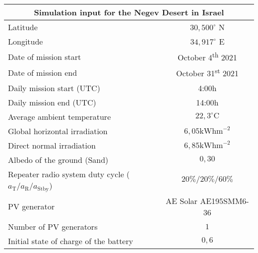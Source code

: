 \footnotesize
\begin{tabular}{|l|c|}
	\hline
	\multicolumn{2}{|c|}{\textbf{Simulation input for the Negev Desert in Israel}} \\
	\hline
	Latitude & $30,500^\circ$ N \\
	Longitude & $34,917^\circ$ E \\ 
	Date of mission start & October 4\textsuperscript{th} 2021 \\
	Date of mission end & October 31\textsuperscript{st} 2021 \\
	Daily mission start (UTC) & 4:00h \\
	Daily mission end (UTC) & 14:00h \\
	Average ambient temperature & $22,3^\circ \mathrm{C}$ \\
	Global horizontal irradiation & $6,05\mathrm{kWhm}^{-2}$ \\
	Direct normal irradiation & $6,85\mathrm{kWhm}^{-2}$ \\
	Albedo of the ground (Sand) & $0,30$ \\
	Repeater radio system duty cycle ($a_\mathrm{T}/a_\mathrm{R}/a_\mathrm{Stby}$) & $20\%/20\%/60\%$ \\
	PV generator & AE Solar AE195SMM6-36 \\
	Number of PV generators & $1$ \\
	Initial state of charge of the battery & $0,6$ \\
	\hline
\end{tabular}